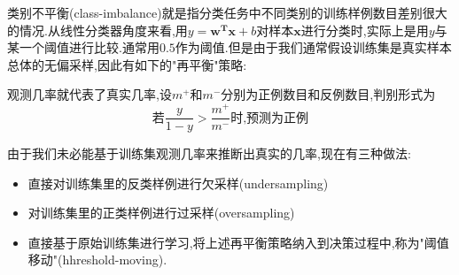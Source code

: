 类别不平衡(class-imbalance)就是指分类任务中不同类别的训练样例数目差别很大的情况.从线性分类器角度来看,用$y=\mathbf{w^Tx}+b$对样本$\mathbf x$进行分类时,实际上是用$y$与某一个阈值进行比较.通常用$0.5$作为阈值.但是由于我们通常假设训练集是真实样本总体的无偏采样,因此有如下的"再平衡"策略:

观测几率就代表了真实几率,设$m^+$和$m^-$分别为正例数目和反例数目,判别形式为
\begin{equation}
\text{若}\frac{y}{1-y}>\frac{m^+}{m^-}\text{时,预测为正例}
\end{equation}

由于我们未必能基于训练集观测几率来推断出真实的几率,现在有三种做法:
\begin{itemize}
\item 直接对训练集里的反类样例进行欠采样(undersampling)
\item 对训练集里的正类样例进行过采样(oversampling)
\item 直接基于原始训练集进行学习,将上述再平衡策略纳入到决策过程中,称为"阈值移动"(hhreshold-moving).
\end{itemize}